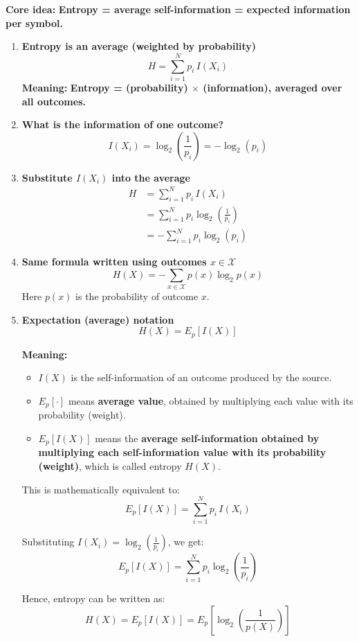 \documentclass[11pt,a4paper]{book}
\newenvironment{derivationbox}[1][Derivation]{
    \begin{tcolorbox}[
        enhanced,
        breakable,
        colback=softpeach!10,
        colframe=softpeach!200,
        title=#1,
        fonttitle=\bfseries,
        sharp corners,
        boxrule=0.8pt,
        left=10pt,
        right=10pt,
        top=8pt,
        bottom=8pt
    ]
}{
    \end{tcolorbox}
}
\begin{document}
\begin{derivationbox}[Entropy Representations]

\textbf{Core idea:} \textbf{Entropy = average self-information = expected information per symbol.}

\begin{enumerate}
    \item \textbf{Entropy is an average (weighted by probability)}
          \[
              \boxed{H = \sum_{i=1}^{N} p_i\, I(X_i)}
          \]
          \textbf{Meaning:} \textbf{Entropy = (probability) $\times$ (information), averaged over all outcomes.}

    \item \textbf{What is the information of one outcome?}
          \[
              \boxed{I(X_i)=\log_2\left(\frac{1}{p_i}\right)=-\log_2(p_i)}
          \]

    \item \textbf{Substitute \(I(X_i)\) into the average}
          \begin{align*}
              H
              & = \sum_{i=1}^{N} p_i\, I(X_i) \\
              & = \sum_{i=1}^{N} p_i \log_2\left(\frac{1}{p_i}\right) \\
              & = -\sum_{i=1}^{N} p_i \log_2(p_i)
          \end{align*}

    \item \textbf{Same formula written using outcomes \(x \in \mathcal{X}\)}
          \[
              \boxed{H(X)=-\sum_{x\in\mathcal{X}} p(x)\log_2 p(x)}
          \]
          Here \(p(x)\) is the probability of outcome \(x\).

    \item \textbf{Expectation (average) notation}
      \[
          H(X)=E_p[I(X)]
      \]

      \textbf{Meaning:}
     \begin{itemize}
    \item \(I(X)\) is the self-information of an outcome produced by the source.
    \item \(E_p[\cdot]\) means \textbf{average value}, obtained by multiplying each value with its probability (weight).
    \item \(E_p[I(X)]\) means the \textbf{average self-information obtained by multiplying each self-information value with its probability (weight)},
          which is called entropy \(H(X)\).
\end{itemize}

      This is mathematically equivalent to:
\[
E_p[I(X)] = \sum_{i=1}^{N} p_i\, I(X_i)
\]

Substituting \(I(X_i)=\log_2\!\left(\frac{1}{p_i}\right)\), we get:
\[
E_p[I(X)]
= \sum_{i=1}^{N} p_i \log_2\!\left(\frac{1}{p_i}\right)
\]

Hence, entropy can be written as:
\[
H(X) = E_p[I(X)]
     = E_p\!\left[\log_2\!\left(\frac{1}{p(X)}\right)\right]
\]

\end{enumerate}

\end{derivationbox}
\end{document}
